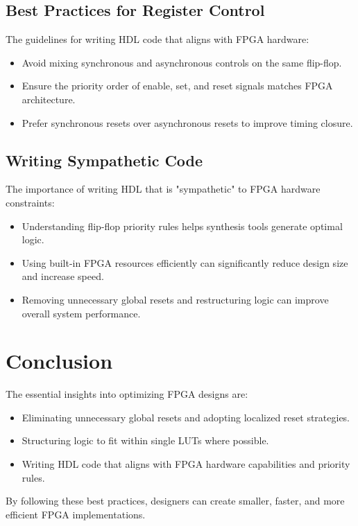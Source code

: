 \documentclass{article}
\begin{document}
	\subsection{Best Practices for Register Control}
	The guidelines for writing HDL code that aligns with FPGA hardware:
	\begin{itemize}
		\item Avoid mixing synchronous and asynchronous controls on the same flip-flop.
		\item Ensure the priority order of enable, set, and reset signals matches FPGA architecture.
		\item Prefer synchronous resets over asynchronous resets to improve timing closure.
	\end{itemize}
	
	\subsection{Writing Sympathetic Code}
	The importance of writing HDL that is "sympathetic" to FPGA hardware constraints:
	\begin{itemize}
		\item Understanding flip-flop priority rules helps synthesis tools generate optimal logic.
		\item Using built-in FPGA resources efficiently can significantly reduce design size and increase speed.
		\item Removing unnecessary global resets and restructuring logic can improve overall system performance.
	\end{itemize}
	
	\section{Conclusion}
	The essential insights into optimizing FPGA designs are:
	\begin{itemize}
		\item Eliminating unnecessary global resets and adopting localized reset strategies.
		\item Structuring logic to fit within single LUTs where possible.
		\item Writing HDL code that aligns with FPGA hardware capabilities and priority rules.
	\end{itemize}
	By following these best practices, designers can create smaller, faster, and more efficient FPGA implementations.
	
\end{document}
